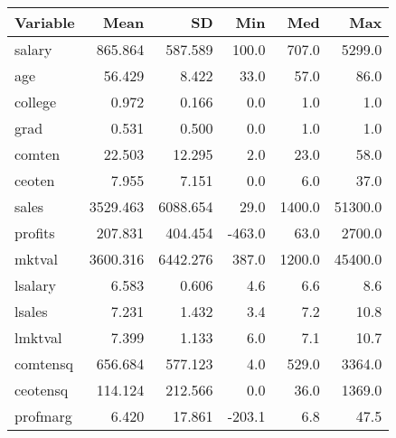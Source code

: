 \begin{tabular}{lrrrrr}
\toprule
Variable & Mean & SD & Min & Med & Max \\ 
\midrule\addlinespace[2.5pt]
salary & 865.864 & 587.589 & 100.0 & 707.0 & 5299.0 \\ 
age & 56.429 & 8.422 & 33.0 & 57.0 & 86.0 \\ 
college & 0.972 & 0.166 & 0.0 & 1.0 & 1.0 \\ 
grad & 0.531 & 0.500 & 0.0 & 1.0 & 1.0 \\ 
comten & 22.503 & 12.295 & 2.0 & 23.0 & 58.0 \\ 
ceoten & 7.955 & 7.151 & 0.0 & 6.0 & 37.0 \\ 
sales & 3529.463 & 6088.654 & 29.0 & 1400.0 & 51300.0 \\ 
profits & 207.831 & 404.454 & -463.0 & 63.0 & 2700.0 \\ 
mktval & 3600.316 & 6442.276 & 387.0 & 1200.0 & 45400.0 \\ 
lsalary & 6.583 & 0.606 & 4.6 & 6.6 & 8.6 \\ 
lsales & 7.231 & 1.432 & 3.4 & 7.2 & 10.8 \\ 
lmktval & 7.399 & 1.133 & 6.0 & 7.1 & 10.7 \\ 
comtensq & 656.684 & 577.123 & 4.0 & 529.0 & 3364.0 \\ 
ceotensq & 114.124 & 212.566 & 0.0 & 36.0 & 1369.0 \\ 
profmarg & 6.420 & 17.861 & -203.1 & 6.8 & 47.5 \\ 
\bottomrule
\end{tabular}

